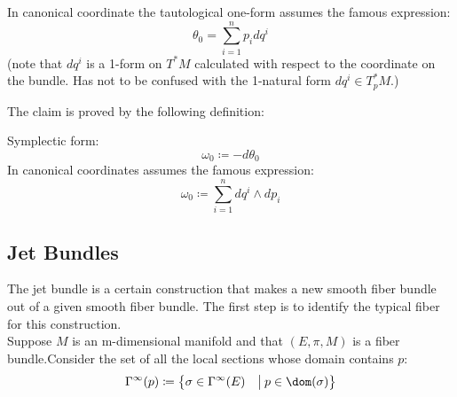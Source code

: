 \documentclass[Main]{subfiles}
\begin{document}
					\begin{observation}
						In canonical coordinate the tautological one-form assumes the famous expression:
						\begin{displaymath}
							\theta_0 = \sum_{i=1}^n {p_i} d q^i
						\end{displaymath}
						(note that $d q^i$ is a 1-form on $T^*M$ calculated with respect to the coordinate on the bundle. Has not to be confused with the 1-natural form $d q^i \in T^*_p M$.)
					\end{observation}
	
					The claim is proved by the following definition:
					\begin{definition}
						Symplectic form:
						\begin{displaymath}
							\omega_0 \coloneqq -d \theta_0
						\end{displaymath}
						In canonical coordinates assumes the famous expression:
						\begin{displaymath}
							\omega_0 \coloneqq \sum_{i=1}^n  d q^i \wedge d p_i
						\end{displaymath}
					\end{definition}
					
		\subsection{Jet Bundles}
			The jet bundle is a certain construction that makes a new smooth fiber bundle out of a given smooth fiber bundle. 			
			The first step is to identify the typical fiber for this construction.
			\\
			Suppose $M$ is an m-dimensional manifold and that $(E, \pi, M)$ is a fiber bundle.Consider the set of all the local sections whose domain contains $p$:
			\begin{displaymath}
				\Gamma^\infty (p) \coloneqq \big\{ \sigma \in \Gamma^\infty(E) \quad \big\vert\:  p \in \dom(\sigma)  \big\}
			\end{displaymath}
\end{document}
